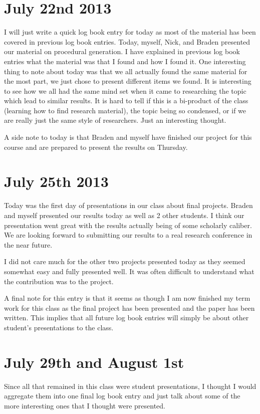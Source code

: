 \documentclass[conference]{IEEEtran}
\begin{document}
\section{July 22nd 2013}
I will just write a quick log book entry for today as most of the material has been covered in previous log book entries.
Today, myself, Nick, and Braden presented our material on procedural generation. I have explained in previous log book entries
what the material was that I found and how I found it. One interesting thing to note about today was that we all actually found
the same material for the most part, we just chose to present different items we found. It is interesting to see how
we all had the same mind set when it came to researching the topic which lead to similar results. It is hard to tell 
if this is a bi-product of the class (learning how to find research material), the topic being so condensed, or if we
are really just the same style of researchers. Just an interesting thought.

A side note to today is that Braden and myself have finished our project for this course and are prepared to present 
the results on Thursday.

\section{July 25th 2013}
Today was the first day of presentations in our class about final projects. Braden and myself presented our results today
as well as 2 other students. I think our presentation went great with the results actually being of some scholarly
caliber. We are looking forward to submitting our results to a real research conference in the near future.

I did not care much for the other two projects presented today as they seemed somewhat easy and fully presented well.
It was often difficult to understand what the contribution was to the project.

A final note for this entry is that it seems as though I am now finished my term work for this class as the final project
has been presented and the paper has been written. This implies that all future log book entries will simply be about
other student's presentations to the class.

\section{July 29th and August 1st}
Since all that remained in this class were student presentations, I thought I would aggregate them into one final
log book entry and just talk about some of the more interesting ones that I thought were presented.
\end{document}
